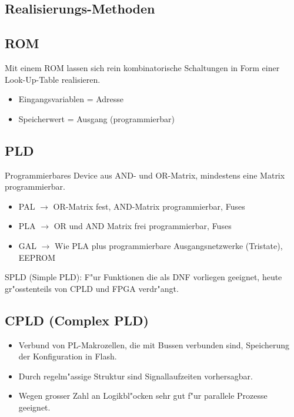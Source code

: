 \begin{scriptsize}

\begin{multicols}{2}
\section{Realisierungs-Methoden}
\subsection{ROM}
Mit einem ROM lassen sich rein kombinatorische Schaltungen in Form einer Look-Up-Table realisieren.
\begin{itemize}
	\setlength{\itemsep}{1pt}
  \setlength{\parskip}{0pt}
  \setlength{\parsep}{0pt}
  
	\item Eingangsvariablen = Adresse
	\item Speicherwert = Ausgang (programmierbar)
\end{itemize}
\vfill\null
\columnbreak
\subsection{PLD}
Programmierbares Device aus AND- und OR-Matrix, mindestens eine Matrix programmierbar.
\begin{itemize}
	\setlength{\itemsep}{1pt}
  \setlength{\parskip}{0pt}
  \setlength{\parsep}{0pt}
  
	\item PAL $\rightarrow$ OR-Matrix fest, AND-Matrix programmierbar, Fuses
	\item PLA $\rightarrow$ OR und AND Matrix frei programmierbar, Fuses
	\item GAL $\rightarrow$ Wie PLA plus programmierbare Ausgangsnetzwerke (Tristate), EEPROM
\end{itemize}
SPLD (Simple PLD): F"ur Funktionen die als DNF vorliegen geeignet, heute gr"osstenteils von CPLD und FPGA verdr"angt.
\end{multicols}

\begin{multicols}{2}
\subsection{CPLD (Complex PLD)}
\begin{itemize}
	\setlength{\itemsep}{1pt}
  \setlength{\parskip}{0pt}
  \setlength{\parsep}{0pt}
  
	\item Verbund von PL-Makrozellen, die mit Bussen verbunden sind, Speicherung der Konfiguration in Flash.
	\item Durch regelm"assige Struktur sind Signallaufzeiten vorhersagbar.
	\item Wegen grosser Zahl an Logikbl"ocken sehr gut f"ur parallele Prozesse geeignet.
\end{itemize}
\vfill\null
\columnbreak

\end{multicols}
\end{scriptsize}
